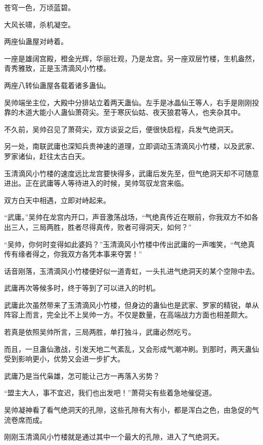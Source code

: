 
\begin{this_body}

苍穹一色，万顷蓝碧。

大风长啸，杀机凝空。

两座仙蛊屋对峙着。

一座是雄阔宫殿，橙金光辉，华丽壮观，乃是龙宫。另一座双层竹楼，生机盎然，青秀雅致，正是玉清滴风小竹楼。

两座八转仙蛊屋各载着诸多蛊仙。

吴帅端坐主位，大殿中分排站立着两天蛊仙。左手是冰晶仙王等人，右手是刚刚投靠的木道大能小人蛊仙萧荷尖。至于寒灰仙姑、夜天狼君等人，也夹杂其中。

不久前，吴帅召见了萧荷尖，双方谈妥之后，便很快启程，兵发气绝洞天。

另一处，南联武庸也深知兵贵神速的道理，立即调动玉清滴风小竹楼，以及武家、罗家诸仙，赶往太古白天。

玉清滴风小竹楼的速度远比龙宫要快得多，武庸后发先至，但气绝洞天却不可随意进出。正在武庸等人等待进入的时候，吴帅驾驭龙宫来临。

双方白天中相遇，立即对峙起来。

“武庸。”吴帅在龙宫内开口，声音激荡战场，“气绝真传近在眼前，你我双方不如各出三人，三局两胜，胜者尽得真传，败者可得洞天，如何？”

“吴帅，你何时变得如此婆妈？”玉清滴风小竹楼中传出武庸的一声嗤笑，“气绝真传有缘者得之，你我双方各凭本事来夺罢！”

话音刚落，玉清滴风小竹楼便好似一道青虹，一头扎进气绝洞天的某个空隙中去。

武庸再次等候多时，终于等到了可以进入的时机。

武庸此次虽然带来了玉清滴风小竹楼，但身边的蛊仙也是武家、罗家的精锐，单从阵容上而言，完全比不上吴帅一方。不仅是数量，在高端战力方面也相差颇大。

若真是依照吴帅所言，三局两胜，单打独斗，武庸必然吃亏。

而且，一旦蛊仙激战，引发天地二气紊乱，又会形成气潮冲刷。到那时，两天蛊仙受到影响更小，优势又会进一步扩大。

武庸乃是当代枭雄，怎可能让己方一再落入劣势？

“盟主大人，事不宜迟，我们也出发吧！”萧荷尖有些着急地催促道。

吴帅凝神看了看气绝洞天的孔隙，这些孔隙有大有小，都是浑白之色，由急促的气流卷席而成。

刚刚玉清滴风小竹楼就是通过其中一个最大的孔隙，进入了气绝洞天。


\end{this_body}
